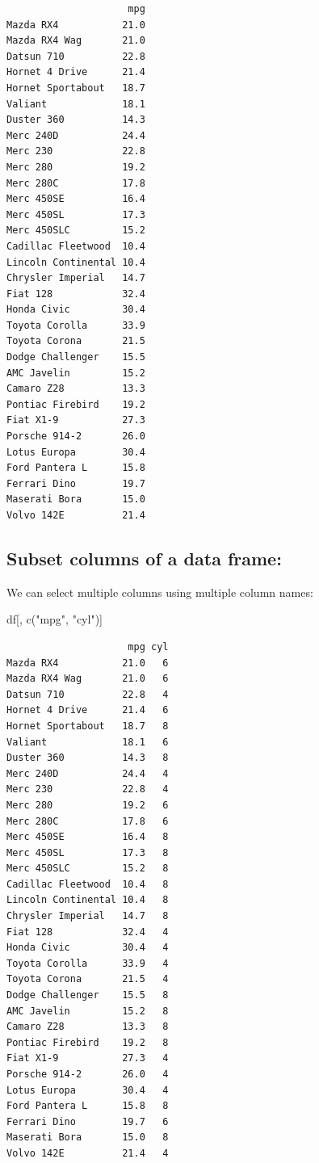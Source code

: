 \documentclass[
]{article}
\newenvironment{Shaded}{\begin{snugshade}}{\end{snugshade}}
\newcommand{\FunctionTok}[1]{\textcolor[rgb]{0.00,0.00,0.00}{#1}}
\newcommand{\NormalTok}[1]{#1}
\newcommand{\StringTok}[1]{\textcolor[rgb]{0.31,0.60,0.02}{#1}}
\begin{document}
\begin{verbatim}
                     mpg
Mazda RX4           21.0
Mazda RX4 Wag       21.0
Datsun 710          22.8
Hornet 4 Drive      21.4
Hornet Sportabout   18.7
Valiant             18.1
Duster 360          14.3
Merc 240D           24.4
Merc 230            22.8
Merc 280            19.2
Merc 280C           17.8
Merc 450SE          16.4
Merc 450SL          17.3
Merc 450SLC         15.2
Cadillac Fleetwood  10.4
Lincoln Continental 10.4
Chrysler Imperial   14.7
Fiat 128            32.4
Honda Civic         30.4
Toyota Corolla      33.9
Toyota Corona       21.5
Dodge Challenger    15.5
AMC Javelin         15.2
Camaro Z28          13.3
Pontiac Firebird    19.2
Fiat X1-9           27.3
Porsche 914-2       26.0
Lotus Europa        30.4
Ford Pantera L      15.8
Ferrari Dino        19.7
Maserati Bora       15.0
Volvo 142E          21.4
\end{verbatim}

\hypertarget{subset-columns-of-a-data-frame-2}{%
\subsection{Subset columns of a data
frame:}\label{subset-columns-of-a-data-frame-2}}

We can select multiple columns using multiple column names:

\begin{Shaded}
\begin{Highlighting}[]
\NormalTok{df[, }\FunctionTok{c}\NormalTok{(}\StringTok{"mpg"}\NormalTok{, }\StringTok{"cyl"}\NormalTok{)]}
\end{Highlighting}
\end{Shaded}

\begin{verbatim}
                     mpg cyl
Mazda RX4           21.0   6
Mazda RX4 Wag       21.0   6
Datsun 710          22.8   4
Hornet 4 Drive      21.4   6
Hornet Sportabout   18.7   8
Valiant             18.1   6
Duster 360          14.3   8
Merc 240D           24.4   4
Merc 230            22.8   4
Merc 280            19.2   6
Merc 280C           17.8   6
Merc 450SE          16.4   8
Merc 450SL          17.3   8
Merc 450SLC         15.2   8
Cadillac Fleetwood  10.4   8
Lincoln Continental 10.4   8
Chrysler Imperial   14.7   8
Fiat 128            32.4   4
Honda Civic         30.4   4
Toyota Corolla      33.9   4
Toyota Corona       21.5   4
Dodge Challenger    15.5   8
AMC Javelin         15.2   8
Camaro Z28          13.3   8
Pontiac Firebird    19.2   8
Fiat X1-9           27.3   4
Porsche 914-2       26.0   4
Lotus Europa        30.4   4
Ford Pantera L      15.8   8
Ferrari Dino        19.7   6
Maserati Bora       15.0   8
Volvo 142E          21.4   4
\end{verbatim}
\end{document}
